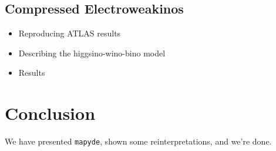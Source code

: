 \documentclass{article}
\begin{document}
\subsection{Compressed Electroweakinos}
\label{reinterp-ewkino}

\begin{itemize}
\item Reproducing ATLAS results
\item Describing the higgsino-wino-bino model
\item Results
\end{itemize}


\section{Conclusion}

We have presented \texttt{mapyde}, shown some reinterpretations, and we're done.

\printbibliography
\end{document}
